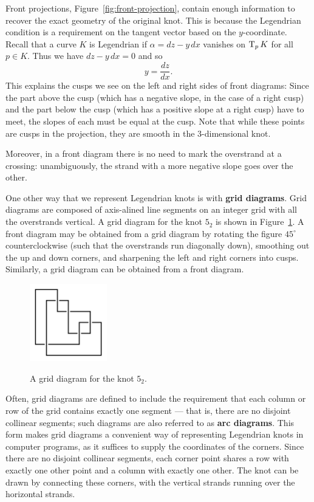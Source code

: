 Front projections, Figure~\ref{fig:front-projection}, contain enough information to recover the exact geometry of the original knot. This is because the Legendrian condition is a requirement on the tangent vector based on the $y$-coordinate. Recall that a curve $K$ is Legendrian if ${\alpha = dz - y\, dx}$ vanishes on $\operatorname{T}_p K$ for all $p \in K$. Thus we have ${dz - y \, dx = 0}$ and so
\[
    y = \frac{dz}{dx}.
\]
This explains the cusps we see on the left and right sides of front diagrams: Since the part above the cusp (which has a negative slope, in the case of a right cusp) and the part below the cusp (which has a positive slope at a right cusp) have to meet, the slopes of each must be equal at the cusp. Note that while these points are cusps in the projection, they are smooth in the 3-dimensional knot.

Moreover, in a front diagram there is no need to mark the overstrand at a crossing: unambiguously, the strand with a more negative slope goes over the other.

One other way that we represent Legendrian knots is with \textbf{grid diagrams}. Grid diagrams are composed of axis-alined line segments on an integer grid with all the overstrands vertical.
A grid diagram for the knot $5_2$ is shown in Figure~\ref{fig:grid}.
A front diagram may be obtained from a grid diagram by rotating the figure $45^\circ$ counterclockwise (such that the overstrands run diagonally down), smoothing out the up and down corners, and sharpening the left and right corners into cusps. Similarly, a grid diagram can be obtained from a front diagram. 

\begin{figure}[ht]
    \centering
    \includegraphics[width=0.3\textwidth]{images/5_2-grid.pdf}
    \label{fig:grid}
    \caption{A grid diagram for the knot $5_2$.}
\end{figure}

Often, grid diagrams are defined to include the requirement that each column or row of the grid contains exactly one segment --- that is, there are no disjoint collinear segments; such diagrams are also referred to as \textbf{arc diagrams}. This form makes grid diagrams a convenient way of representing Legendrian knots in computer programs, as it suffices to supply the coordinates of the corners. Since there are no disjoint collinear segments, each corner point shares a row with exactly one other point and a column with exactly one other. The knot can be drawn by connecting these corners, with the vertical strands running over the horizontal strands.


